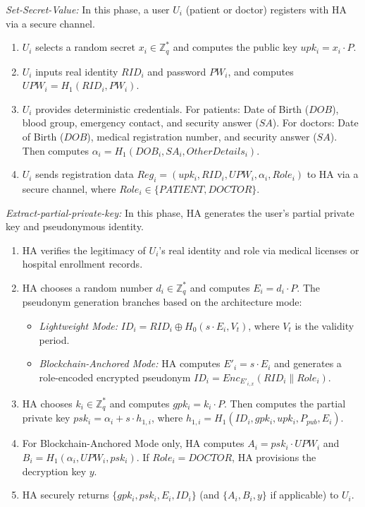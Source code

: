 \documentclass[conference]{IEEEtran}
\begin{document}
\textit{Set-Secret-Value:} In this phase, a user $U_i$ (patient or doctor) registers with HA via a secure channel.

\begin{enumerate}
\item $U_i$ selects a random secret $x_i \in \mathbb{Z}_q^*$ and computes the public key $upk_i = x_i \cdot P$.

\item $U_i$ inputs real identity $RID_i$ and password $PW_i$, and computes $UPW_i = H_1(RID_i, PW_i)$.

\item $U_i$ provides deterministic credentials. For patients: Date of Birth ($DOB$), blood group, emergency contact, and security answer ($SA$). For doctors: Date of Birth ($DOB$), medical registration number, and security answer ($SA$). Then computes $\alpha_i = H_1(DOB_i, SA_i, OtherDetails_i)$.

\item $U_i$ sends registration data $Reg_i = (upk_i, RID_i, UPW_i, \alpha_i, Role_i)$ to HA via a secure channel, where $Role_i \in \{PATIENT, DOCTOR\}$.
\end{enumerate}

\noindent\textit{Extract-partial-private-key:} In this phase, HA generates the user's partial private key and pseudonymous identity.

\begin{enumerate}
\item HA verifies the legitimacy of $U_i$'s real identity and role via medical licenses or hospital enrollment records.

\item HA chooses a random number $d_i \in \mathbb{Z}_q^*$ and computes $E_i = d_i \cdot P$. The pseudonym generation branches based on the architecture mode:

\begin{itemize}
\item \textit{Lightweight Mode:} $ID_i = RID_i \oplus H_0(s \cdot E_i, V_t)$, where $V_t$ is the validity period.

\item \textit{Blockchain-Anchored Mode:} HA computes $E'_i = s \cdot E_i$ and generates a role-encoded encrypted pseudonym $ID_i = Enc_{E'_{i,x}}(RID_i \| Role_i)$.
\end{itemize}

\item HA chooses $k_i \in \mathbb{Z}_q^*$ and computes $gpk_i = k_i \cdot P$. Then computes the partial private key $psk_i = \alpha_i + s \cdot h_{1,i}$, where $h_{1,i} = H_1(ID_i, gpk_i, upk_i, P_{pub}, E_i)$.

\item For Blockchain-Anchored Mode only, HA computes $A_i = psk_i \cdot UPW_i$ and $B_i = H_1(\alpha_i, UPW_i, psk_i)$. If $Role_i = DOCTOR$, HA provisions the decryption key $y$.

\item HA securely returns $\{gpk_i, psk_i, E_i, ID_i\}$ (and $\{A_i, B_i, y\}$ if applicable) to $U_i$.
\end{enumerate}
\end{document}
